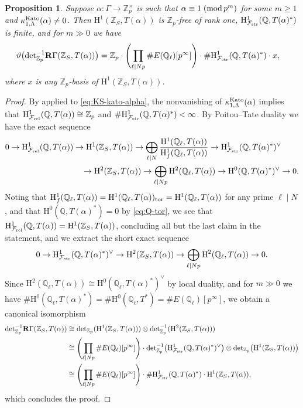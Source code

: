 \documentclass[10pt,reqno]{amsart}
\numberwithin{equation}{section}
\theoremstyle{plain}
\theoremstyle{definition}
\theoremstyle{definition}
\theoremstyle{plain}
\newtheorem{prop}[thm]{Proposition}
\theoremstyle{plain}
\theoremstyle{plain}
\theoremstyle{plain}
\theoremstyle{plain}
\theoremstyle{plain}
\newcommand{\Z}{\mathbb{Z}}
\newcommand{\Q}{\mathbb{Q}}
\newcommand{\Fcal}{\mathcal{F}}
\newcommand{\rH}{\mathrm{H}}
\begin{document}
\begin{prop}\label{prop:descent-Q}
Suppose $\alpha:\Gamma\rightarrow\Z_p^\times$ is such that $\alpha\equiv 1\;({\rm mod}\,p^m)$ for some $m\geq 1$ and  $\kappa_{1,\Lambda}^{\rm Kato}(\alpha)\neq 0$. Then $\rH^1_{}(\Z_S,T(\alpha))$ is $\Z_p$-free of rank one, $\rH^1_{\Fcal_{\rm str}}(\Q,T(\alpha)^*)$ is finite, and for $m\gg 0$ we have
\begin{align*}
\vartheta\bigl({\rm det}_{\Z_p}^{-1}\mathbf{R}\Gamma(\Z_S,T(\alpha))\bigr)&=\Z_p\cdot\Biggl(\prod_{\ell\mid Np}\#E(\Q_\ell)[p^\infty]\Biggr)\cdot\#\rH^1_{\Fcal_{\rm str}}(\Q,T(\alpha)^*)\cdot x,
\end{align*}
where $x$ is any $\Z_p$-basis of $\rH^1(\Z_S,T(\alpha))$.
\end{prop}

\begin{proof}
By \cite[Thm.~5.2.2]{mazrub} applied to \eqref{eq:KS-kato-alpha}, the nonvanishing of $\kappa_{1,\Lambda}^{\rm Kato}(\alpha)$ implies that $\rH_{\Fcal_{\rm rel}}^1(\Q,T(\alpha))\cong\Z_p$ and  $\#\rH^1_{\Fcal_{\rm str}}(\Q,T(\alpha)^*)<\infty$. By Poitou--Tate duality we have the exact sequence
\begin{equation}\label{eq:PT-1}
\begin{aligned}
0\rightarrow\rH^1_{\Fcal_{\rm rel}}(\Q,T(\alpha))&\rightarrow \rH^1(\Z_S,T(\alpha))\rightarrow\bigoplus_{\ell\mid N}
\frac{\rH^1(\Q_\ell,T(\alpha))}{\rH^1_{f}(\Q_\ell,T(\alpha))}\rightarrow \rH^1_{\Fcal_{\rm str}}(\Q,T(\alpha)^*)^\vee\\
&\quad\rightarrow \rH^2(\Z_S,T(\alpha))\rightarrow\bigoplus_{\ell\mid Np}\rH^2(\Q_\ell,T(\alpha))\rightarrow \rH^0(\Q,T(\alpha)^*)^\vee\rightarrow 0.
\end{aligned}
\end{equation}
Noting that $\rH^1_{f}(\Q_\ell,T(\alpha))=\rH^1(\Q_\ell,T(\alpha))_{\rm tor}=\rH^1(\Q_\ell,T(\alpha))$ for any prime $\ell\mid N$, and that $\rH^0(\Q,T(\alpha)^\ast)=0$ by \eqref{eq:Q-tor}, we see that $\rH^1_{\Fcal_{\rm rel}}(\Q,T(\alpha))=\rH^1(\Z_S,T(\alpha))$, concluding all but the last claim in the statement, and we extract the short exact sequence
\[
0\rightarrow \rH^1_{\Fcal_{\rm str}}(\Q,T(\alpha)^*)^\vee\rightarrow \rH^2(\Z_S,T(\alpha))\rightarrow\bigoplus_{\ell\mid Np}\rH^2(\Q_\ell,T(\alpha))\rightarrow 0.
\]
Since $\rH^2(\Q_\ell,T(\alpha))\cong \rH^0(\Q_\ell,T(\alpha)^*)^\vee$ by local duality, and for $m\gg 0$ we have $\#\rH^0(\Q_\ell,T(\alpha)^*)=\# \rH^0(\Q_\ell,T^*)=\#E(\Q_\ell)[p^\infty]$, we obtain a canonical isomorphism
\begin{align*}
{\rm det}_{\Z_p}^{-1}\mathbf{R}\Gamma(\Z_S,T(\alpha))&\cong{\rm det}_{\Z_p}(\rH^1(\Z_S,T(\alpha)))\otimes{\rm det}_{\Z_p}^{-1}(\rH^2(\Z_S,T(\alpha)))\\
&\cong\Biggl(\prod_{\ell\mid Np}\#E(\Q_\ell)[p^\infty]\Biggr)\cdot{\rm det}_{\Z_p}^{-1}\bigl(\rH^1_{\Fcal_{\rm str}}(\Q,T(\alpha)^*)^\vee\bigr)\otimes{\rm det}_{\Z_p}\bigl(\rH^1(\Z_S,T(\alpha))\bigr)\\
&\cong \Biggl(\prod_{\ell\mid Np}\#E(\Q_\ell)[p^\infty]\Biggr)\cdot\#\rH^1_{\Fcal_{\rm str}}(\Q,T(\alpha)^*)\cdot\rH^1(\Z_S,T(\alpha)),
\end{align*}
which concludes the proof.
\end{proof}
\end{document}
